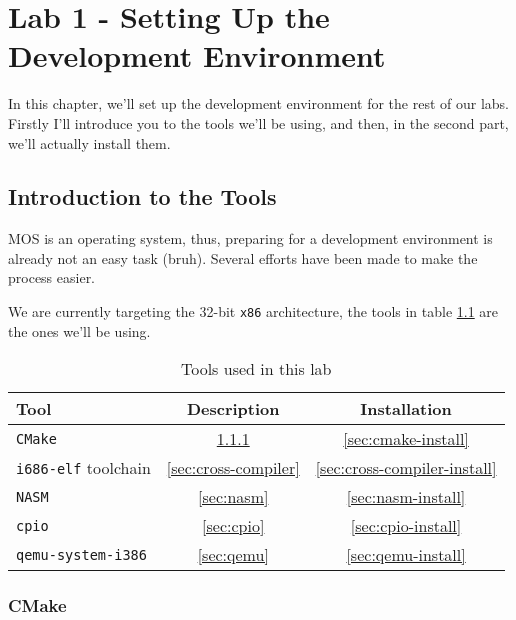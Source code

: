 \chapter{Lab 1 - Setting Up the Development Environment}

In this chapter, we'll set up the development environment for the rest of our labs. Firstly
I'll introduce you to the tools we'll be using, and then, in the second part, we'll actually
install them.

\section{Introduction to the Tools}

MOS is an operating system, thus, preparing for a development environment is already not
an easy task (bruh). Several efforts have been made to make the process easier.

We are currently targeting the 32-bit \texttt{x86} architecture, the tools in table \ref{tab:tools}
are the ones we'll be using.

\begin{table}[h!]
    \centering
    \begin{tabular}{|l|c|c|}
        \hline \textbf{Tool}               & \textbf{Description}     & \textbf{Installation}            \\
        \hline \texttt{CMake}              & \ref{sec:cmake}          & \ref{sec:cmake-install}          \\
        \hline \texttt{i686-elf} toolchain & \ref{sec:cross-compiler} & \ref{sec:cross-compiler-install} \\
        \hline \texttt{NASM}               & \ref{sec:nasm}           & \ref{sec:nasm-install}           \\
        \hline \texttt{cpio}               & \ref{sec:cpio}           & \ref{sec:cpio-install}           \\
        \hline \texttt{qemu-system-i386}   & \ref{sec:qemu}           & \ref{sec:qemu-install}           \\
        \hline
    \end{tabular}
    \caption{Tools used in this lab}
    \label{tab:tools}
\end{table}

\subsection{CMake} \label{sec:cmake}

